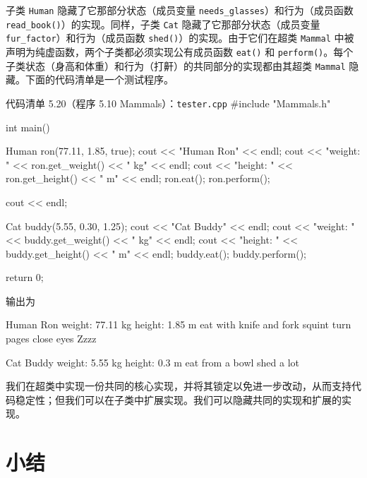 子类 \texttt{Human} 隐藏了它那部分状态（成员变量 \texttt{needs\_\allowbreak{}glasses}）和行为（成员函数 \texttt{read\_\allowbreak{}book(\allowbreak{})\allowbreak{}}）的实现。同样，子类 \texttt{Cat} 隐藏了它那部分状态（成员变量 \texttt{fur\_\allowbreak{}factor}）和行为（成员函数 \texttt{shed()}）的实现。由于它们在超类 \texttt{Mammal} 中被声明为纯虚函数，两个子类都必须实现公有成员函数 \texttt{eat()} 和 \texttt{perform()}。每个子类状态（身高和体重）和行为（打鼾）的共同部分的实现都由其超类 \texttt{Mammal} 隐藏。下面的代码清单是一个测试程序。

\begin{codeboxt}{代码清单 5.20（程序 5.10 Mammals）：\texttt{tester.\allowbreak{}cpp}}
#include "Mammals.h"

int main()
{
    Human ron(77.11, 1.85, true);
    cout << "Human Ron" << endl;
    cout << "weight: " << ron.get_weight() << " kg" << endl;
    cout << "height: " << ron.get_height() << " m" << endl;
    ron.eat();
    ron.perform();

    cout << endl;
 
    Cat buddy(5.55, 0.30, 1.25);
    cout << "Cat Buddy" << endl;
    cout << "weight: " << buddy.get_weight() << " kg" << endl;
    cout << "height: " << buddy.get_height() << " m" << endl;
    buddy.eat();
    buddy.perform();

    return 0;
}
\end{codeboxt}

输出为

\begin{codebox}
Human Ron
weight: 77.11 kg
height: 1.85 m
eat with knife and fork
squint
turn pages
close eyes
Zzzz

Cat Buddy
weight: 5.55 kg
height: 0.3 m
eat from a bowl
shed a lot
\end{codebox}

我们在超类中实现一份共同的核心实现，并将其锁定以免进一步改动，从而支持代码稳定性；但我们可以在子类中扩展实现。我们可以隐藏共同的实现和扩展的实现。

\section*{小结}

